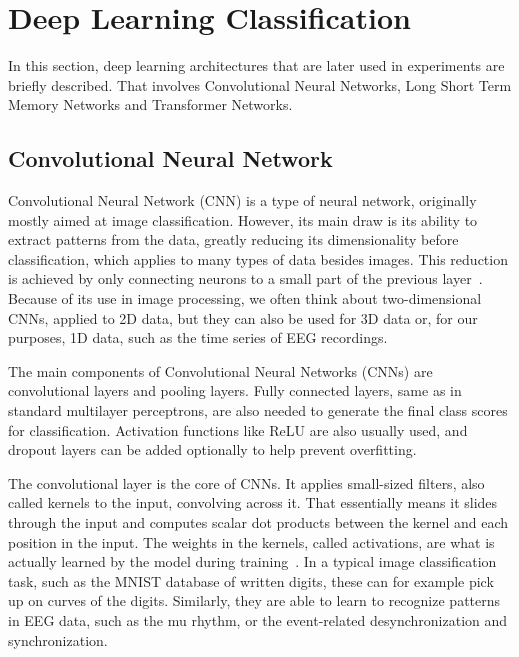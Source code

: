 \documentclass[english, he, bc, kiv, iso690alph, viewonly]{fasthesis}
\begin{document}

\section{Deep Learning Classification}

In this section, deep learning architectures that are later used in experiments are briefly described. That involves Convolutional Neural Networks, Long Short Term Memory Networks and Transformer Networks.


\subsection{Convolutional Neural Network}

Convolutional Neural Network (CNN) is a type of neural network, originally mostly aimed at image classification. However, its main draw is its ability to extract patterns from the data, greatly reducing its dimensionality before classification, which applies to many types of data besides images. This reduction is achieved by only connecting neurons to a small part of the previous layer~\cite{oshea:cnn:15}. Because of its use in image processing, we often think about two-dimensional CNNs, applied to 2D data, but they can also be used for 3D data or, for our purposes, 1D data, such as the time series of EEG recordings.

The main components of Convolutional Neural Networks (CNNs) are convolutional layers and pooling layers. Fully connected layers, same as in standard multilayer perceptrons, are also needed to generate the final class scores for classification. Activation functions like ReLU are also usually used, and dropout layers can be added optionally to help prevent overfitting.

The convolutional layer is the core of CNNs. It applies small-sized filters, also called kernels to the input, convolving across it. That essentially means it slides through the input and computes scalar dot products between the kernel and each position in the input. The weights in the kernels, called activations, are what is actually learned by the model during training~\cite{oshea:cnn:15}. In a typical image classification task, such as the MNIST database of written digits, these can for example pick up on curves of the digits. Similarly, they are able to learn to recognize patterns in EEG data, such as the mu rhythm, or the event-related desynchronization and synchronization.
\end{document}
